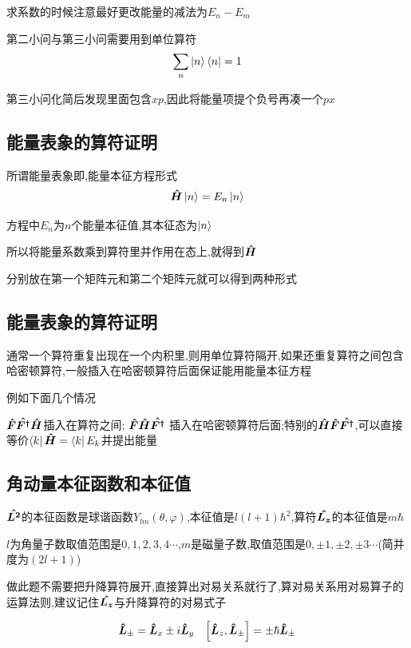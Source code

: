 \documentclass{article}
\begin{document}
            求系数的时候注意最好更改能量的减法为$E_{n} - E_{m}$
            
            第二小问与第三小问需要用到单位算符
            $$ \sum_{n} \ket{n} \bra{n} = 1 $$

            第三小问化简后发现里面包含$xp$,因此将能量项提个负号再凑一个$px$

        \subsection{能量表象的算符证明}
            所谓能量表象即,能量本征方程形式
                $$ \vu*{H} \ket{n} = E_{n} \ket{n} $$

            方程中$E_{n}$为$n$个能量本征值,其本征态为$\ket{n}$

            所以将能量系数乘到算符里并作用在态上,就得到$\vu*{H}$

            分别放在第一个矩阵元和第二个矩阵元就可以得到两种形式
        \subsection{能量表象的算符证明}
            通常一个算符重复出现在一个内积里,则用单位算符隔开,如果还重复算符之间包含哈密顿算符,一般插入在哈密顿算符后面保证能用能量本征方程
            
            例如下面几个情况
            

            $\vu*{F}\vu*{{F^{\dagger}}}\vu*{H}$插入在算符之间; $\vu*{F}\vu*{H} \vu*{F^{\dagger}}$ 插入在哈密顿算符后面;特别的$\vu*{H} \vu*{F} \vu*{F^{\dagger}}$,可以直接等价$ \bra{k} \vu*{H} = \bra{k} E_{k}$并提出能量
        
        \subsection{角动量本征函数和本征值}
            $\vu*{L^{2}}$的本征函数是球谐函数$Y_{lm}(\theta,\varphi)$,本征值是$l(l+1)\hbar^{2}$,算符$\vu*{L_{z}}$的本征值是$m\hbar$
            
            $l$为角量子数取值范围是$0,1,2,3,4\cdots$,$m$是磁量子数,取值范围是$0,\pm1,\pm2,\pm3\cdots$(简并度为$(2l+1)$)

            做此题不需要把升降算符展开,直接算出对易关系就行了,算对易关系用对易算子的运算法则,建议记住$\vu*{L_{z}}$与升降算符的对易式子

            $$\vu*{L}_{\pm} = \vu*{L}_{x} \pm  i \vu*{L}_{y} \quad \comm{\vu*{L}_{z}}{\vu*{{L}}_{\pm}} = \pm \hbar \vu*{L}_{\pm} $$
\end{document}
